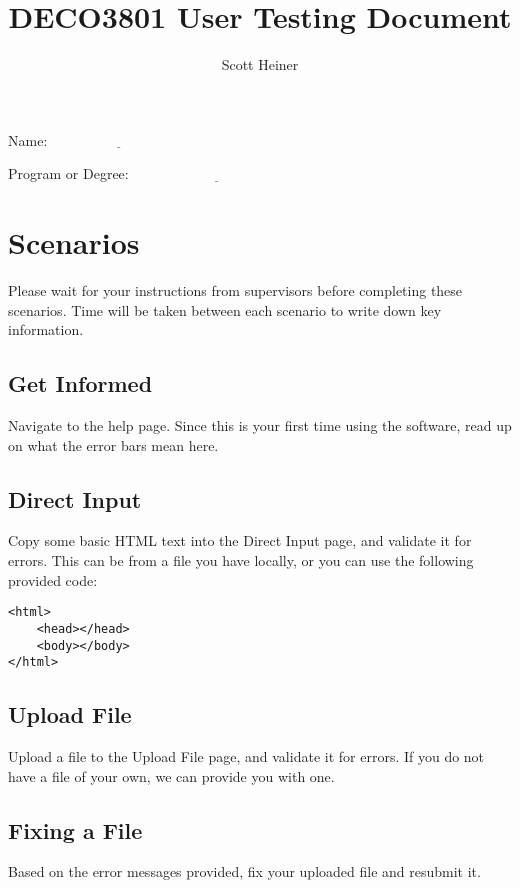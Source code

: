 \documentclass[11pt]{article}
\title{\bf DECO3801 User Testing Document}
\author{Scott Heiner}
\date{}
\begin{document}
\maketitle

Name: $\underline{\hspace{4cm}}$

Program or Degree: $\underline{\hspace{5cm}}$

\section*{Scenarios}

Please wait for your instructions from supervisors before completing these scenarios. Time will be taken between each scenario to write down key information.

\subsection*{Get Informed}

Navigate to the help page. Since this is your first time using the software, read up on what the error bars mean here.

\subsection*{Direct Input}

Copy some basic HTML text into the Direct Input page, and validate it for errors. This can be from a file you have locally, or you can use the following provided code:
\begin{verbatim}
<html>
	<head></head>
	<body></body>
</html>
\end{verbatim}

\subsection*{Upload File}

Upload a file to the Upload File page, and validate it for errors. If you do not have a file of your own, we can provide you with one.

\subsection*{Fixing a File}

Based on the error messages provided, fix your uploaded file and resubmit it.
\end{document}
